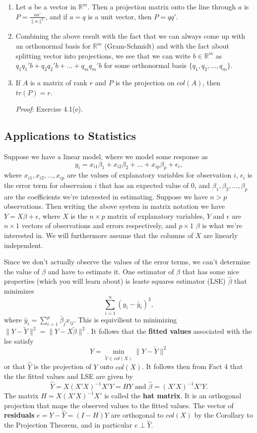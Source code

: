 \documentclass[12pt,oneside]{article}
\begin{document}
\begin{enumerate}
\item Let $a$ be a vector in ${\mathbb{R}}^m$. Then a projection
  matrix onto the line through $a$ is $P = \frac{a a'}{\|a\|^2}$, and if
  $a = q$ is a unit vector, then $P = qq'$.


\item Combining the above result with the fact that we can always come
  up with an orthonormal basis for ${\mathbb{R}}^m$ (Gram-Schmidt) and
  with the fact about splitting vector into projections, we see that
  we can write $b \in {\mathbb{R}}^m$ as $q_1 q_1' b + q_2  q_2' b +
  \ldots + q_m q_m' b$ for some orthonormal basis $\{q_1, q_2, \ldots,
  q_m\}$.

\item If $A$ is a matrix of rank $r$ and $P$ is the projection on $col(A)$, then $tr(P) = r$.

\emph{Proof}: Exercise 4.1(e).

\end{enumerate}

\subsection{Applications to Statistics}
 Suppose we have a linear model, where we model some response as $$y_i
 = x_{i1} \beta_1 + x_{i2} \beta_2 + \ldots + x_{ip} \beta_p +
 \epsilon_i,$$ where $x_{i1}, x_{i2}, \ldots, x_{ip}$ are the values of
 explanatory variables for observation $i$, $\epsilon_i$ is the error
 term for observaion $i$ that has an expected value of 0, and
 $\beta_1, \beta_2, \ldots, \beta_p$ are the coefficients we're
 interested in estimating. Suppose we have $n > p$ observations. Then
 writing the above system in matrix notation we have $Y  = X \beta +
 \epsilon$, where $X$ is the $n \times p$ matrix of explanatory
 variables, $Y$ and $\epsilon$ are $n \times 1$ vectors of observations and
 errors respectively, and $p \times 1$ $\beta$ is what we're
 interested in. We will furthermore assume that the columns of $X$ are
 linearly independent.

 Since we don't actually observe the values of the error terms, we
 can't determine the value of $\beta$ and have to estimate it. One
 estimator of $\beta$ that has some nice properties (which you will
 learn about)  is leaste squares estimator (LSE) $\hat{\beta}$
 that minimizes 
\[\displaystyle\sum_{i=1}^n {(y_i - \tilde{y_i} )^2},\]
 where $\tilde{y_i}=\displaystyle\sum_{i=1}^p \tilde{\beta_j}x_{ij}$. This is equivilient to minimizing \( \| Y-\tilde{Y}\|^2=\|Y-X\tilde{\beta}\|^2\). It follows that the \textbf{fitted values} associated with the lse satisfy 
\[ \hat{Y}=\min\limits_{\tilde{Y}\in col(X)} \|Y-\tilde{Y}\|^2\]
or that \(\hat{Y} \) is the projection of \(Y\) onto \(col(X)\). It follows then from Fact 4 that the the fitted values and LSE are given by 
\[ \hat{Y}=X(X'X)^{-1}X'Y=HY \text{    and    } \hat{\beta}=(X'X)^{-1}X'Y.\]
The matrix $H = X(X'X)^{-1}X'$ is called the \textbf{hat matrix}. It is an orthogonal projection that maps the observed values to the fitted values. The vector of  \textbf{residuals} \(e = Y - \hat{Y} = (I - H) Y\) are orthogonal to \(col(X)\) by the Corollary to the Projection Theorem, and in particular \(e \perp \hat{Y}\). 
\end{document}
